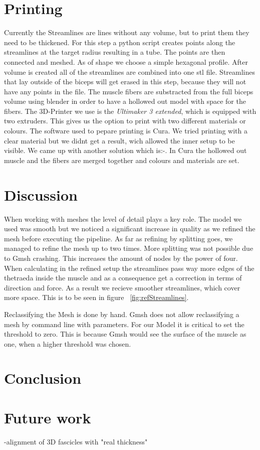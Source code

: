 \documentclass[preprint,journal]{vgtc}       %
\begin{document}
\section{Printing}
Currently the Streamlines are lines without any volume, but to print them they need to be thickened. 
For this step a python script creates points along the streamlines at the target radius resulting in a tube.
The points are then connected and meshed. 
As of shape we choose a simple hexagonal profile. 
After volume is created all of the streamlines are combined into one stl file. 
Streamlines that lay outside of the biceps will get erased in this step, because they will not have any points in the file. 
The muscle fibers are substracted from the full biceps volume using blender in order to have a hollowed out model with space for the fibers. 
The 3D-Printer we use is the \textit{Ultimaker 3 extended}, which is equipped with two extruders. 
This gives us the option to print with two different materials or colours. %
The software used to pepare printing is Cura. 
We tried printing with a clear material but we didnt get a result, wich allowed the inner setup to be visible. We came up with another solution which is:-.
In Cura the hollowed out muscle and the fibers are merged together and colours and materials are set.

\section{Discussion}
When working with meshes the level of detail plays a key role. The model we used was smooth but we noticed a significant increase in quality as we refined the mesh before executing the pipeline. As far as refining by splitting goes, we managed to refine the mesh up to two times. More splitting was not possible due to Gmsh crashing. This increases the amount of nodes by the power of four. When calculating in the refined setup the streamlines pass way more edges of the thetraeda inside the muscle and as a consequence get a correction in terms of direction and force. As a result we recieve smoother streamlines, which cover more space. This is to be seen in figure ~\ref{fig:refStreamlines}.

Reclassifying the Mesh is done by hand. Gmsh does not allow reclassifying a mesh by command line with parameters. For our Model it is critical to set the threshold to zero. This is because Gmsh would see the surface of the muscle as one, when a higher threshold was chosen.

\section{Conclusion}


\section{Future work}
-alignment of 3D fascicles with "real thickness"



\end{document}

